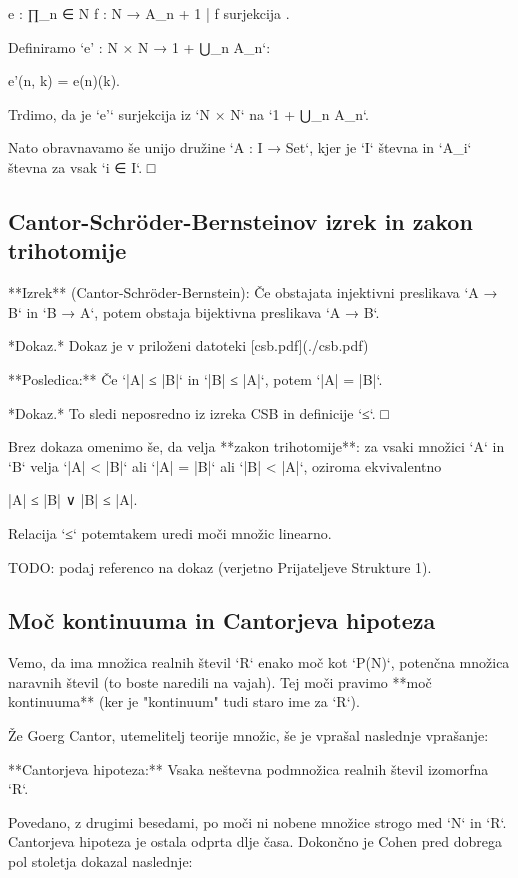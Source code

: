     e : ∏_{n ∈ N} { f : N → A_n + 1 | f surjekcija }.

Definiramo `e' : N × N → 1 + ⋃_n A_n`:

    e'(n, k) = e(n)(k).

Trdimo, da je `e'` surjekcija iz `N × N` na `1 + ⋃_n A_n`.

Nato obravnavamo še unijo družine `A : I → Set`, kjer je `I` števna in `A_i`
števna za vsak `i ∈ I`. □

\subsection{Cantor-Schröder-Bernsteinov izrek in zakon trihotomije}

**Izrek** (Cantor-Schröder-Bernstein): Če obstajata injektivni preslikava `A → B`
in `B → A`, potem obstaja bijektivna preslikava `A → B`.

*Dokaz.* Dokaz je v priloženi datoteki [csb.pdf](./csb.pdf)


**Posledica:** Če `|A| ≤ |B|` in `|B| ≤ |A|`, potem `|A| = |B|`.

*Dokaz.* To sledi neposredno iz izreka CSB in definicije `≤`. □

Brez dokaza omenimo še, da velja **zakon trihotomije**: za vsaki množici `A` in `B`
velja `|A| < |B|` ali `|A| = |B|` ali `|B| < |A|`, oziroma ekvivalentno

    |A| ≤ |B| ∨ |B| ≤ |A|.

Relacija `≤` potemtakem uredi moči množic linearno.

TODO: podaj referenco na dokaz (verjetno Prijateljeve Strukture 1).

\subsection{Moč kontinuuma in Cantorjeva hipoteza}

Vemo, da ima množica realnih števil `R` enako moč kot `P(N)`, potenčna množica
naravnih števil (to boste naredili na vajah). Tej moči pravimo **moč
kontinuuma** (ker je "kontinuum" tudi staro ime za `R`).

Že Goerg Cantor, utemelitelj teorije množic, še je vprašal naslednje vprašanje:

**Cantorjeva hipoteza:** Vsaka neštevna podmnožica realnih števil izomorfna `R`.

Povedano, z drugimi besedami, po moči ni nobene množice strogo med `N` in `R`.
Cantorjeva hipoteza je ostala odprta dlje časa. Dokončno je Cohen pred dobrega
pol stoletja dokazal naslednje:

